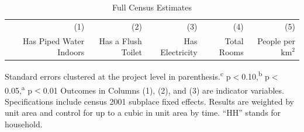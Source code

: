 \documentclass[12pt]{article}
\begin{document}
\begin{table}[hbt!]
\small
\centering
\caption{Housing Density Estimates by Distances Outside Projects}\label{table:bbluDDDdist}
\vspace{-2mm}
\end{table}



\begin{table}[hbt!]
\small
\centering
\caption{Full Census Estimates}\label{table:censusestimatesfull}
\vspace{-2mm}
\begin{threeparttable}
\begin{tabular}{lDDDDD}
\toprule
 & \small (1) & \small (2)  & \small (3) & \small (4) & \small (5) \\
& \small Has Piped Water Indoors  & \small Has a Flush Toilet  & \small Has Electricity & \small Total Rooms &  \small People per $\text{km}^{2}$   \\ \midrule
 
% 
\bottomrule
\end{tabular}
\begin{tablenotes}
\item Standard errors clustered at the project level in parenthesis.\textsuperscript{c} p$<$0.10,\textsuperscript{b} p$<$0.05,\textsuperscript{a} p$<$0.01
Outcomes in Columns (1), (2), and (3) are indicator variables.
Specifications include census 2001 subplace fixed effects.
Results are weighted by unit area and control for up to a cubic in unit area by time. 
``HH'' stands for household.
\end{tablenotes}
\end{threeparttable}
\end{table}
\end{document}
